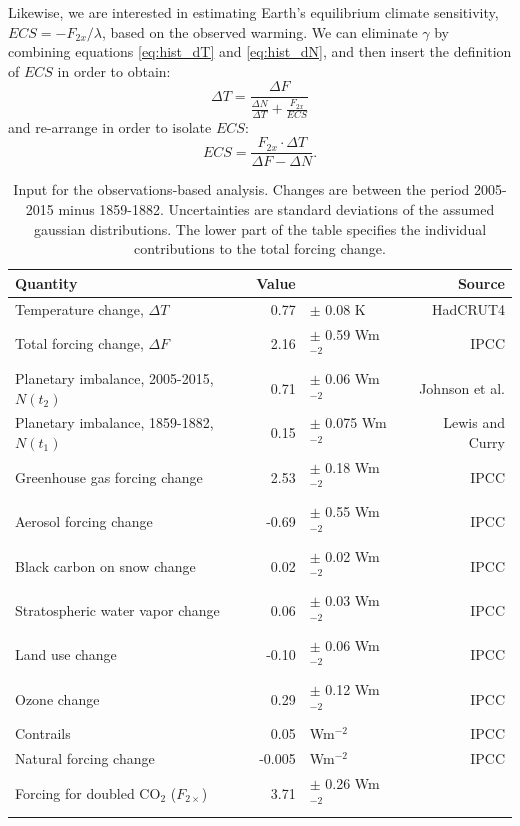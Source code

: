 \documentclass[12pt]{book}
\begin{document}
Likewise, we are interested in estimating Earth's equilibrium climate sensitivity, $ECS=-F_{2x}/\lambda$, based on the observed warming. 
We can eliminate $\gamma$ by combining equations \ref{eq:hist_dT} and \ref{eq:hist_dN}, and then insert the definition of $ECS$ in order to obtain:
$$\Delta T = \frac{\Delta F}{\frac{\Delta N}{\Delta T}+\frac{F_{2x}}{ECS}}$$
and re-arrange in order to isolate $ECS$:
\begin{equation}
ECS = \frac{F_{2x}\cdot \Delta T}{\Delta F - \Delta N}.
\label{eq:zero_ecs}
\end{equation}


\begin{table}
	\caption{Input for the observations-based analysis. Changes are between the period 2005-2015 minus 1859-1882. Uncertainties are standard deviations of the assumed gaussian distributions. The lower part of the table specifies the individual contributions to the total forcing change.  }
	\vspace{0.5 cm}
	\centering
	\begin{tabular}{lrlr}
		\hline
		Quantity & Value &  & Source\\
		\hline
		Temperature change, $\Delta T$     & 0.77&$\pm$ 0.08 K                  & HadCRUT4\citep{Morice:2012dw} \\
		Total forcing change, $\Delta F$      & 2.16&$\pm$ 0.59 Wm$^{-2}$   & IPCC\citep{IPCC:2013is} \\    
		Planetary imbalance, 2005-2015, $N(t_2)$            & 0.71&$\pm$ 0.06 Wm$^{-2}$   & Johnson et al.\citep{Johnson:2016do} \\
		Planetary imbalance, 1859-1882, $N(t_1)$                     & 0.15&$\pm$ 0.075 Wm$^{-2}$ & Lewis and Curry\citep{Lewis:2014jt} \\    
		\hline
		Greenhouse gas forcing change   & 2.53&$\pm$ 0.18 Wm$^{-2}$   & IPCC\citep{IPCC:2013is} \\    
		Aerosol forcing change                  &-0.69&$\pm$ 0.55 Wm$^{-2}$   & IPCC\citep{IPCC:2013is} \\    
		Black carbon on snow change      & 0.02&$\pm$ 0.02 Wm$^{-2}$   & IPCC\citep{IPCC:2013is} \\     
		Stratospheric water vapor change& 0.06&$\pm$ 0.03 Wm$^{-2}$   & IPCC\citep{IPCC:2013is} \\        
		Land use change                          &-0.10&$\pm$ 0.06 Wm$^{-2}$   & IPCC\citep{IPCC:2013is} \\        
		Ozone change                              & 0.29&$\pm$ 0.12 Wm$^{-2}$   & IPCC\citep{IPCC:2013is} \\        
		Contrails                                        & 0.05& Wm$^{-2}$                     & IPCC\citep{IPCC:2013is} \\        
		Natural forcing change                  & -0.005 &  Wm$^{-2}$                & IPCC\citep{IPCC:2013is} \\ 
		\hline
		Forcing for doubled CO$_2$ ($F_{2\times}$)           & 3.71&$\pm$ 0.26 Wm$^{-2}$   & \\        
		\hline
	\end{tabular}
	\label{table:input}
\end{table}
\end{document}
